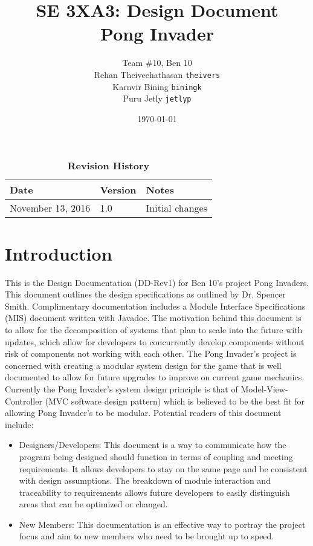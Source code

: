 \documentclass[12pt, titlepage]{article}
\title{SE 3XA3: Design Document\\Pong Invader}
\author{Team \#10, Ben 10
		\\ Rehan Theiveehathasan \texttt{theivers}
		\\ Karnvir Bining                  \texttt{biningk}
		\\ Puru Jetly                        \texttt{jetlyp}
}
\date{\today}
\begin{document}
\maketitle
{}
\tableofcontents
\listoftables
\listoffigures
\begin{table}[bp]
\caption{\bf Revision History}
\begin{tabularx}{\textwidth}{p{3cm}p{2cm}X}
\toprule {\bf Date} & {\bf Version} & {\bf Notes}\\
\midrule
November 13, 2016 & 1.0 & Initial changes\\

\bottomrule
\end{tabularx}
\end{table}
\newpage
{}
\section{Introduction}
This is the Design Documentation (DD-Rev1) %
for Ben 10’s project Pong Invaders. This document outlines the design specifications as outlined by Dr. Spencer Smith.
Complimentary documentation includes a Module Interface Specifications (MIS) %
document written with Javadoc.
\color{red}
The motivation behind this document is to allow for the decomposition of systems that plan to scale into the future with updates, which allow for developers to concurrently develop components without risk of components not working with each other. The Pong Invader's project is concerned with creating a modular system design for the game that is well documented to allow for future upgrades to improve on current game mechanics. Currently the Pong Invader's system design principle is that of Model-View-Controller (MVC software design pattern) which is believed to be the best fit for allowing Pong Invader's to be modular.
\color{black}
Potential readers of this document include:
\begin{itemize}
\item Designers/Developers: This document is a way to communicate how the program being designed should function in terms of coupling and meeting requirements. It allows developers to stay on the same page and be consistent with design assumptions. The breakdown of module interaction and traceability to requirements allows future developers to easily distinguish areas that can be optimized or changed. 
\item New Members: This documentation is an effective way to portray the project focus and aim to new members who need to be brought up to speed.
\end{itemize}
\end{document}
